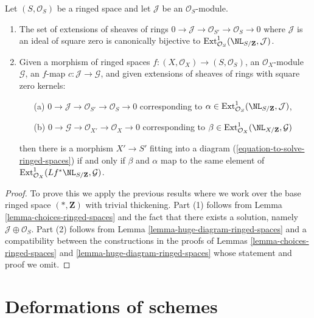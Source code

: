 \begin{lemma}
\label{lemma-extensions-of-ringed-spaces}
Let $(S, \mathcal{O}_S)$ be a ringed space and let $\mathcal{J}$
be an $\mathcal{O}_S$-module.
\begin{enumerate}
\item The set of extensions of sheaves of rings
$0 \to \mathcal{J} \to \mathcal{O}_{S'} \to \mathcal{O}_S \to 0$
where $\mathcal{J}$ is an ideal of square zero is canonically bijective to
$\text{Ext}^1_{\mathcal{O}_S}(\NL_{S/\mathbf{Z}}, \mathcal{J})$.
\item Given a morphism of ringed spaces
$f : (X, \mathcal{O}_X) \to (S, \mathcal{O}_S)$, an $\mathcal{O}_X$-module
$\mathcal{G}$, an $f$-map $c : \mathcal{J} \to \mathcal{G}$, and
given extensions of sheaves of rings with square zero kernels:
\begin{enumerate}
\item[(a)] $0 \to \mathcal{J} \to \mathcal{O}_{S'} \to \mathcal{O}_S \to 0$
corresponding to
$\alpha \in \text{Ext}^1_{\mathcal{O}_S}(\NL_{S/\mathbf{Z}}, \mathcal{J})$,
\item[(b)] $0 \to \mathcal{G} \to \mathcal{O}_{X'} \to \mathcal{O}_X \to 0$
corresponding to
$\beta \in \text{Ext}^1_{\mathcal{O}_X}(\NL_{X/\mathbf{Z}}, \mathcal{G})$
\end{enumerate}
then there is a morphism $X' \to S'$ fitting into a diagram
(\ref{equation-to-solve-ringed-spaces}) if and only if $\beta$ and $\alpha$
map to the same element of
$\text{Ext}^1_{\mathcal{O}_X}(Lf^*\NL_{S/\mathbf{Z}}, \mathcal{G})$.
\end{enumerate}
\end{lemma}

\begin{proof}
To prove this we apply the previous results where we work over
the base ringed space $(*, \mathbf{Z})$ with trivial thickening.
Part (1) follows from Lemma \ref{lemma-choices-ringed-spaces}
and the fact that there exists a solution, namely
$\mathcal{J} \oplus \mathcal{O}_S$.
Part (2) follows from Lemma \ref{lemma-huge-diagram-ringed-spaces}
and a compatibility between the constructions in the proofs
of Lemmas \ref{lemma-choices-ringed-spaces} and
\ref{lemma-huge-diagram-ringed-spaces}
whose statement and proof we omit.
\end{proof}








\section{Deformations of schemes}
\label{section-deformations-schemes}

